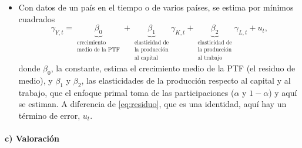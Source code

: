 \documentclass[11pt]{article}
\begin{document}
\begin{itemize}
\item Con datos de un país en el tiempo o de varios países, se estima por mínimos cuadrados
  \begin{equation}
  \gamma_{Y,t}=\underbrace{\beta_0}_{\substack{\text{crecimiento}\\\text{medio de la PTF}}}+\underbrace{\beta_1}_{\substack{\text{elasticidad de}\\\text{la producción}\\\text{al capital}}}\gamma_{K,t}+\underbrace{\beta_2}_{\substack{\text{elasticidad de}\\\text{la producción}\\\text{al trabajo}}}\gamma_{L,t}+u_t ,\label{eq:econometrico}
  \end{equation}
  donde $\beta_0$, la constante, estima el crecimiento medio de la PTF (el residuo de  medio), y $\beta_1$ y $\beta_2$, las elasticidades de la producción respecto al capital y al trabajo, que el enfoque primal toma de las participaciones ($\alpha$ y $1-\alpha$) y aquí se estiman. A diferencia de \eqref{eq:residuo}, que es una identidad, aquí hay un término de error, $u_t$.
\end{itemize}

\paragraph{c) Valoración}
\end{document}
